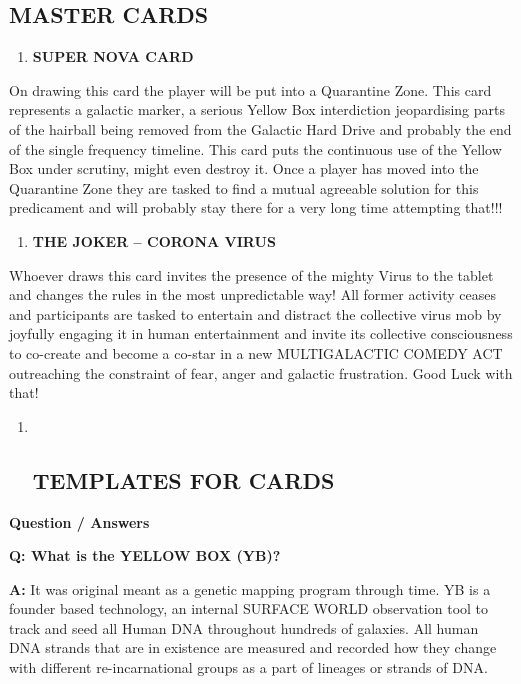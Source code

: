 \subsection{MASTER CARDS}\label{master-cards}

\begin{enumerate}
\def\labelenumi{\arabic{enumi}.}
\tightlist
\item
  \textbf{SUPER NOVA CARD}
\end{enumerate}

On drawing this card the player will be put into a Quarantine Zone. This
card represents a galactic marker, a serious Yellow Box interdiction
jeopardising parts of the hairball being removed from the Galactic Hard
Drive and probably the end of the single frequency timeline. This card
puts the continuous use of the Yellow Box under scrutiny, might even
destroy it. Once a player has moved into the Quarantine Zone they are
tasked to find a mutual agreeable solution for this predicament and will
probably stay there for a very long time attempting that!!!

\begin{enumerate}
\def\labelenumi{\arabic{enumi}.}
\tightlist
\item
  \textbf{THE JOKER -- CORONA VIRUS}
\end{enumerate}

Whoever draws this card invites the presence of the mighty Virus to the
tablet and changes the rules in the most unpredictable way! All former
activity ceases and participants are tasked to entertain and distract
the collective virus mob by joyfully engaging it in human entertainment
and invite its collective consciousness to co-create and become a
co-star in a new MULTIGALACTIC COMEDY ACT outreaching the constraint of
fear, anger and galactic frustration. Good Luck with that!

\begin{enumerate}
\def\labelenumi{\arabic{enumi}.}
\item ~
  \subsection{TEMPLATES FOR CARDS}\label{templates-for-cards}
\end{enumerate}

\textbf{Question / Answers}

\textbf{Q: What is the YELLOW BOX (YB)?}

\textbf{A:} It was original meant as a genetic mapping program through
time. YB is a founder based technology, an internal SURFACE WORLD
observation tool to track and seed all Human DNA throughout hundreds of
galaxies. All human DNA strands that are in existence are measured and
recorded how they change with different re-incarnational groups as a
part of lineages or strands of DNA.


